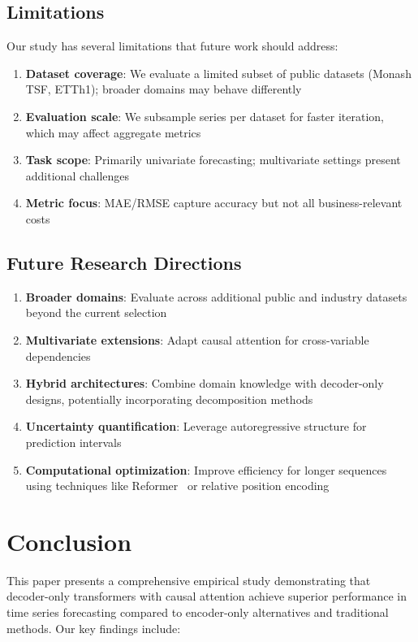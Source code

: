 \documentclass[11pt]{article}
\begin{document}
\subsection{Limitations}

Our study has several limitations that future work should address:
\begin{enumerate}
\item \textbf{Dataset coverage}: We evaluate a limited subset of public datasets (Monash TSF, ETTh1); broader domains may behave differently
\item \textbf{Evaluation scale}: We subsample series per dataset for faster iteration, which may affect aggregate metrics
\item \textbf{Task scope}: Primarily univariate forecasting; multivariate settings present additional challenges
\item \textbf{Metric focus}: MAE/RMSE capture accuracy but not all business-relevant costs
\end{enumerate}

\subsection{Future Research Directions}

\begin{enumerate}
\item \textbf{Broader domains}: Evaluate across additional public and industry datasets beyond the current selection
\item \textbf{Multivariate extensions}: Adapt causal attention for cross-variable dependencies
\item \textbf{Hybrid architectures}: Combine domain knowledge with decoder-only designs, potentially incorporating decomposition methods~\cite{cleveland1990stl}
\item \textbf{Uncertainty quantification}: Leverage autoregressive structure for prediction intervals
\item \textbf{Computational optimization}: Improve efficiency for longer sequences using techniques like Reformer~\cite{kitaev2020reformer} or relative position encoding~\cite{shaw2018self}
\end{enumerate}

\section{Conclusion}

This paper presents a comprehensive empirical study demonstrating that decoder-only transformers with causal attention achieve superior performance in time series forecasting compared to encoder-only alternatives and traditional methods. Our key findings include:
\end{document}
